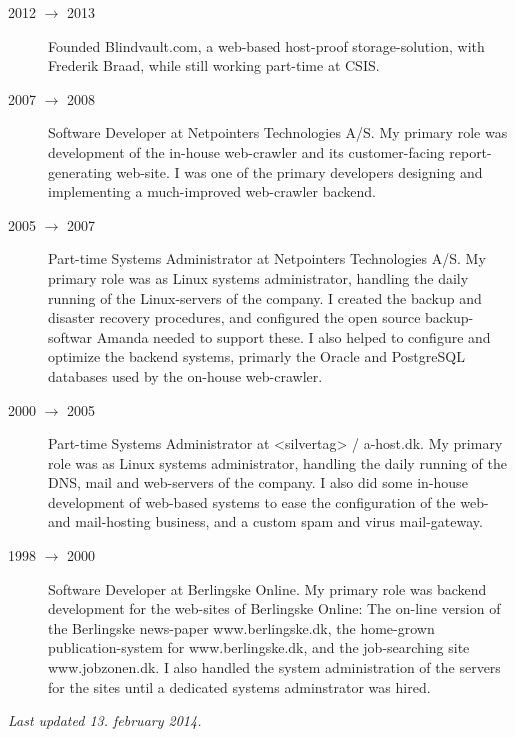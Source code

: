 \documentclass[margin,line,a4paper]{resume}
\begin{document}
\begin{resume}
\begin{description}
\item[2012 $\rightarrow$ 2013] Founded Blindvault.com, a web-based host-proof
storage-solution, with Frederik Braad, while still working part-time at CSIS.

\item[2007 $\rightarrow$ 2008] Software Developer at Netpointers Technologies
A/S. My primary role was development of the in-house web-crawler and its
customer-facing report-generating web-site. I was one of the primary
developers designing and implementing a much-improved web-crawler backend.

\item[2005 $\rightarrow$ 2007] Part-time Systems Administrator at Netpointers
Technologies A/S. My primary role was as Linux systems administrator, handling
the daily running of the Linux-servers of the company. I created the backup
and disaster recovery procedures, and configured the open source
backup-softwar Amanda needed to support these. I also helped to configure and
optimize the backend systems, primarly the Oracle and PostgreSQL databases
used by the on-house web-crawler.


\item[2000 $\rightarrow$ 2005] Part-time Systems Administrator at <silvertag>
/ a-host.dk. My primary role was as Linux systems administrator, handling the
daily running of the DNS, mail and web-servers of the company. I also did some
in-house development of web-based systems to ease the configuration of the
web- and mail-hosting business, and a custom spam and virus
mail-gateway.

\item[1998 $\rightarrow$ 2000] Software Developer at Berlingske Online.
My primary role was backend development for the web-sites of Berlingske
Online: The on-line version of the Berlingske news-paper www.berlingske.dk,
the home-grown publication-system for www.berlingske.dk, and the job-searching
site www.jobzonen.dk. I also handled the system administration of the servers
for the sites until a dedicated systems adminstrator was hired.
\end{description}


{\em Last updated 13. february 2014.}
\end{resume}
\end{document}
